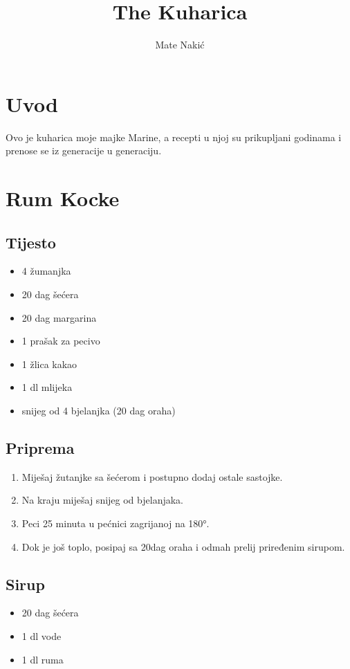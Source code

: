 \documentclass{article}
\title{The Kuharica}
\author{Mate Nakić}
\begin{document}
\maketitle

\newpage

\section{Uvod}
Ovo je kuharica moje majke Marine, a recepti u njoj su prikupljani godinama
i prenose se iz generacije u generaciju.

\section{Rum Kocke}
\subsection{Tijesto}
\begin{itemize}
  \item 4 žumanjka
  \item 20 dag šećera
  \item 20 dag margarina
  \item 1 prašak za pecivo
  \item 1 žlica kakao
  \item 1 dl mlijeka
  \item snijeg od 4 bjelanjka (20 dag oraha)
\end{itemize}
\subsection{Priprema}
\begin{enumerate}
  \item Miješaj žutanjke sa šećerom i postupno dodaj ostale sastojke.
  \item Na kraju miješaj snijeg od bjelanjaka.
  \item Peci 25 minuta u pećnici zagrijanoj na 180°.
  \item Dok je još toplo, posipaj sa 20dag oraha i odmah prelij priređenim sirupom.
\end{enumerate}

\subsection{Sirup}
\begin{itemize}
  \item 20 dag šećera
  \item 1 dl vode
  \item 1 dl ruma
\end{itemize}
\end{document}

